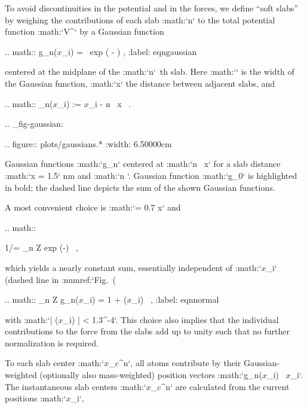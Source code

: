 To avoid discontinuities in the potential and in the forces, we define
“soft slabs” by weighing the contributions of each slab :math:`n` to the
total potential function :math:`V^` by a Gaussian function

.. math:: g_n({\mbox{\boldmath ${x}$}}_i) = \Gamma \ \mbox{exp} \left(
          -  \right) ,
          :label: eqngaussian

centered at the midplane of the :math:`n`\ th slab. Here :math:`\sigma`
is the width of the Gaussian function, :math:`\Delta x` the distance
between adjacent slabs, and

.. math:: \beta_n({\mbox{\boldmath ${x}$}}_i) := {\mbox{\boldmath ${x}$}}_i \cdot {} - n \, \Delta x \, .

.. _fig-gaussian:

.. figure:: plots/gaussians.*
   :width: 6.50000cm

   Gaussian functions :math:`g_n` centered at :math:`n \, \Delta x` for
   a slab distance :math:`\Delta x = 1.5` nm and :math:`n `.
   Gaussian function :math:`g_0` is highlighted in bold; the dashed line
   depicts the sum of the shown Gaussian functions.

A most convenient choice is :math:`\sigma = 0.7 \Delta x` and

.. math::

   1/\Gamma = \sum_{n \in Z}
   \mbox{exp}
   \left(-\right)
    \, ,

which yields a nearly constant sum, essentially independent of
:math:`{\mbox{\boldmath ${x}$}}_i` (dashed line in
:numref:`Fig. (%

.. math:: \sum_{n \in Z} g_n({\mbox{\boldmath ${x}$}}_i) =  1 + \epsilon({\mbox{\boldmath ${x}$}}_i) \, ,
          :label: eqnnormal

with
:math:`| \epsilon({\mbox{\boldmath ${x}$}}_i) | < 1.3^{-4}`.
This choice also implies that the individual contributions to the force
from the slabs add up to unity such that no further normalization is
required.

To each slab center :math:`{\mbox{\boldmath ${x}$}}_c^n`, all atoms
contribute by their Gaussian-weighted (optionally also mass-weighted)
position vectors
:math:`g_n({\mbox{\boldmath ${x}$}}_i) \, {\mbox{\boldmath ${x}$}}_i`.
The instantaneous slab centers :math:`{\mbox{\boldmath ${x}$}}_c^n` are
calculated from the current positions
:math:`{\mbox{\boldmath ${x}$}}_i`,

